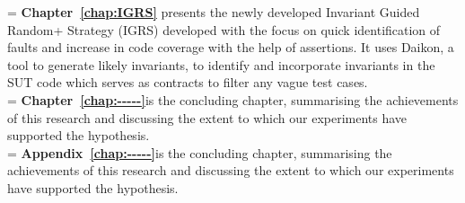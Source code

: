  
\hangindent=\parindent
{}
\noindent
\textbf{Chapter~\ref{chap:IGRS}} presents the newly developed Invariant Guided Random+ Strategy (IGRS) developed with the focus on quick identification of faults and increase in code coverage with the help of assertions. It uses Daikon, a tool to generate likely invariants, to identify and incorporate invariants in the SUT code which serves as contracts to filter any vague test cases. \\

\hangindent=\parindent
{}
\noindent
\textbf{Chapter~\ref{chap:-----}}is the concluding chapter, summarising the achievements of this research and discussing the extent to which our experiments have supported the hypothesis.\\


\hangindent=\parindent
{}
\noindent
\textbf{Appendix~\ref{chap:-----}}is the concluding chapter, summarising the achievements of this research and discussing the extent to which our experiments have supported the hypothesis.\\












